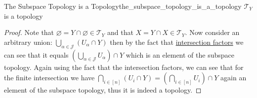 \begin{proposition}{The Subspace Topology is a
Topology}{the_subspace_topology_is_a_topology}
\( \mathcal{ T } _{ Y }   \) is a topology
\end{proposition}
\begin{proof}
    Note that \( \varnothing = Y \cap \varnothing \in  \mathcal{ T } _{ Y }
    \) and that \( X = Y \cap  X \in  \mathcal{ T } _{ Y } \). Now consider an
    arbitrary union: \( \bigcup _{ \alpha \in \mathcal{ J }   } \left( U _{
    \alpha } \cap Y \right)  \) then by the fact that
    \hyperref[proposition:intersection_factors]{intersection factors} we can see
    that it equals \( \left( \bigcup _{ \alpha \in \mathcal{ J }   } U _{ \alpha
    } \right) \cap Y \) which is an element of the subspace topology. Again
    using the fact that the intersection factors, we can see that for the finite
    intersection we have \( \bigcap _{ i \in  \left[ n \right]  } \left( U _{ i
    } \cap  Y \right) = \left( \bigcap _{ i \in  \left[ n \right]  } U _{ i }
    \right) \cap  Y\) again an element of the subspace topology, thus it is
    indeed a topology.
\end{proof}
